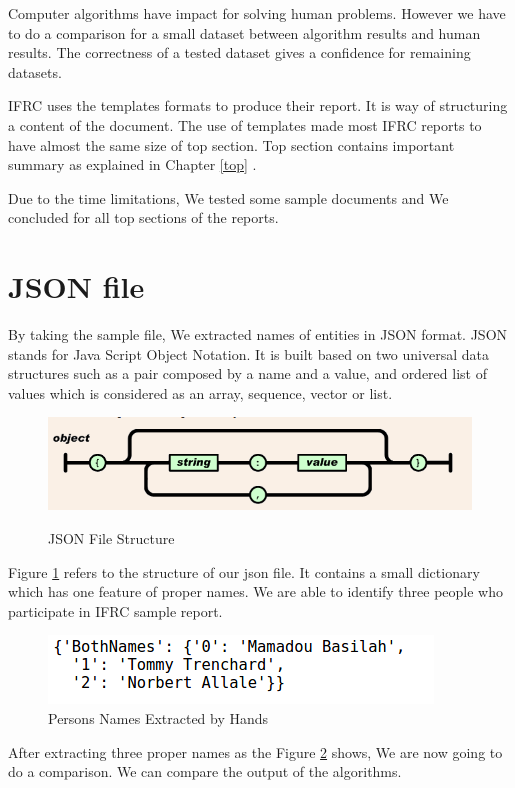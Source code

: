 Computer algorithms have impact for solving human problems. However we have to do a comparison for a small dataset between algorithm results and human results. The correctness of a tested dataset gives a confidence for remaining datasets.

IFRC uses the templates formats to produce their report. It is way of structuring a content of the document. The use of templates made most IFRC reports to have almost  the same size of top section. Top section contains important summary  as explained in Chapter \ref{top} .

Due to the time limitations, We tested  some  sample documents and We concluded for all top sections of the reports.
\section*{JSON file }
By taking the sample file, We extracted names of entities in JSON format. JSON stands for Java Script Object Notation. It is built based on two universal data structures such as a pair composed by a name and a value, and ordered list of values which is considered as an array, sequence, vector or list.
\begin{figure}[hbtp]
\caption{JSON File Structure}
\centering
\includegraphics[scale=.7]{images/json.png}\label{json}
\end{figure}


Figure \ref{json} refers to the structure of our json file. It contains a small dictionary which has one feature of proper names. We are able to identify three people who participate in IFRC sample report.
\newpage 
\begin{figure}[hbtp]
\centering
\includegraphics[scale=.7]{images/BothNames.png}
\caption{Persons Names Extracted by Hands}\label{Hand}
\end{figure}

After extracting three proper names as the Figure \ref{Hand} shows,  We are now going to do a comparison. We can compare the output of the algorithms.

